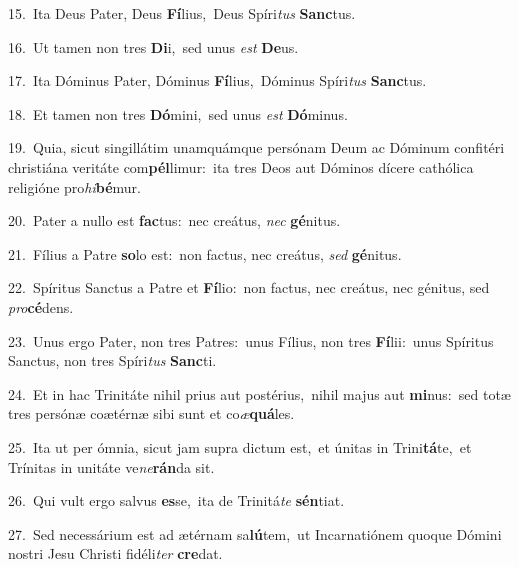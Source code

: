 {\numbfont\textcolor{\numbcolor}{15.}}~Ita Deus Pater, Deus \textbf{Fí}\-lius,~\star Deus Spíri\textit{tus} \textbf{Sanc}\-tus.\par
{\numbfont\textcolor{\numbcolor}{16.}}~Ut tamen non tres \textbf{Di}\-i,~\star sed unus \textit{est} \textbf{De}\-us.\par
{\numbfont\textcolor{\numbcolor}{17.}}~Ita Dóminus Pater, Dóminus \textbf{Fí}\-lius,~\star Dóminus Spíri\textit{tus} \textbf{Sanc}\-tus.\par
{\numbfont\textcolor{\numbcolor}{18.}}~Et tamen non tres \textbf{Dó}\-mini,~\star sed unus \textit{est} \textbf{Dó}\-minus.\par
{\numbfont\textcolor{\numbcolor}{19.}}~Quia, sicut singillátim unamquámque persónam Deum ac Dóminum confitéri christiána veritáte com\-\textbf{pél}\-limur:~\star ita tres Deos aut Dóminos dícere cathólica religióne pro\-\textit{hi}\-\textbf{bé}mur.\par
{\numbfont\textcolor{\numbcolor}{20.}}~Pater a nullo est \textbf{fac}\-tus:~\star nec creátus, \textit{nec} \textbf{gé}\-nitus.\par
{\numbfont\textcolor{\numbcolor}{21.}}~Fílius a Patre \textbf{so}\-lo est:~\star non factus, nec creátus, \textit{sed} \textbf{gé}\-nitus.\par
{\numbfont\textcolor{\numbcolor}{22.}}~Spíritus Sanctus a Patre et \textbf{Fí}\-lio:~\star non factus, nec creátus, nec génitus, sed \textit{pro}\-\textbf{cé}dens.\par
{\numbfont\textcolor{\numbcolor}{23.}}~Unus ergo Pater, non tres Patres:~\dagger unus Fílius, non tres \textbf{Fí}\-lii:~\star unus Spíritus Sanctus, non tres Spíri\textit{tus} \textbf{Sanc}\-ti.\par
{\numbfont\textcolor{\numbcolor}{24.}}~Et in hac Trinitáte nihil prius aut postérius,~\dagger nihil majus aut \textbf{mi}\-nus:~\star sed totæ tres persónæ coætérnæ sibi sunt et co\-\textit{æ}\-\textbf{quá}les.\par
{\numbfont\textcolor{\numbcolor}{25.}}~Ita ut per ómnia, sicut jam supra dictum est,~\dagger et únitas in Trini\-\textbf{tá}\-te,~\star et Trínitas in unitáte ve\-\textit{ne}\-\textbf{rán}da sit.\par
{\numbfont\textcolor{\numbcolor}{26.}}~Qui vult ergo salvus \textbf{es}\-se,~\star ita de Trinitá\textit{te} \textbf{sén}\-tiat.\par
{\numbfont\textcolor{\numbcolor}{27.}}~Sed necessárium est ad ætérnam sa\-\textbf{lú}\-tem,~\star ut Incarnatiónem quoque Dómini nostri Jesu Christi fidéli\textit{ter} \textbf{cre}\-dat.\par
